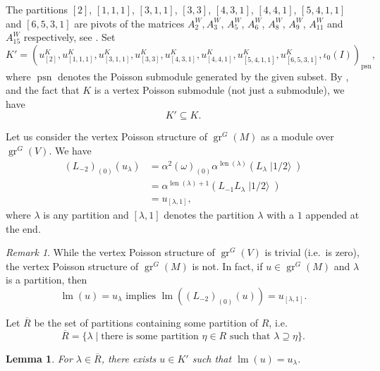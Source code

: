 \documentclass[a4paper, 12pt, reqno]{amsart}
\newtheorem{lemma}[theorem]{Lemma}
\theoremstyle{remark}
\newtheorem{remark}[theorem]{Remark}
\DeclareMathOperator{\gr}{gr}
\DeclareMathOperator{\lm}{lm}
\DeclareMathOperator{\len}{len}
\DeclareMathOperator{\psn}{psn}
\DeclareMathOperator{\vachalf}{|1/2\rangle}
\begin{document}
The partitions $[2]$, $[1, 1, 1]$, $[3, 1, 1]$, $[3, 3]$, $[4, 3, 1]$, $[4, 4, 1]$, $[5, 4, 1, 1]$ and $[6, 5, 3, 1]$ are pivots of the matrices $A^W_2, A^W_3$, $A^W_5$, $A^W_6$, $A^W_8$, $A^W_9$, $A^W_{11}$ and $A^W_{15}$ respectively, see \cite[ising-modules.ipynb]{sagemath2}.
Set
\begin{equation*}
  K' = (u^K_{[2]}, u^K_{[1, 1, 1]}, u^K_{[3, 1, 1]}, u^K_{[3, 3]}, u^K_{[4, 3, 1]}, u^K_{[4, 4, 1]}, u^K_{[5, 4, 1, 1]}, u^K_{[6, 5, 3, 1]}, \iota_0(I))_{\psn},
\end{equation*}
where $\psn$ denotes the Poisson submodule generated by the given subset.
By ,  and the fact that $K$ is a vertex Poisson submodule (not just a submodule), we have
\begin{equation*}
K' \subseteq K.
\end{equation*}

Let us consider the vertex Poisson structure of $\gr^G(M)$ as a module over $\gr^G(V)$.
We have
\begin{align*}
  (L_{-2})_{(0)}(u_{\lambda}) &= \alpha^2(\omega)_{(0)}\alpha^{\len(\lambda)}(L_{\lambda}\vachalf) \\
  &= \alpha^{\len(\lambda) + 1}(L_{-1}L_{\lambda}\vachalf) \\
  &= u_{[\lambda, 1]},
\end{align*}
where $\lambda$ is any partition and $[\lambda, 1]$ denotes the partition $\lambda$ with a $1$ appended at the end.

\begin{remark}
  \label{rmk:5}
  While the vertex Poisson structure of $\gr^G(V)$ is trivial (i.e.\ is zero), the vertex Poisson structure of $\gr^G(M)$ is not.
  In fact, if $u \in \gr^G(M)$ and $\lambda$ is a partition, then
  \begin{equation*}
    \lm(u) = u_{\lambda}\text{ implies }\lm((L_{-2})_{(0)}(u)) = u_{[\lambda, 1]}.
  \end{equation*}
\end{remark}

Let $\overline{R}$ be the set of partitions containing some partition of $R$, i.e.
\begin{equation*}
  \overline{R} = \{\lambda \mid \text{there is some partition }\eta \in R\text{ such that }\lambda \supseteq \eta\}.
\end{equation*}

\begin{lemma}
  \label{lmm:10}
  For $\lambda \in \overline{R}$, there exists $u \in K'$ such that $\lm(u) = u_{\lambda}$.
\end{lemma}
\end{document}
